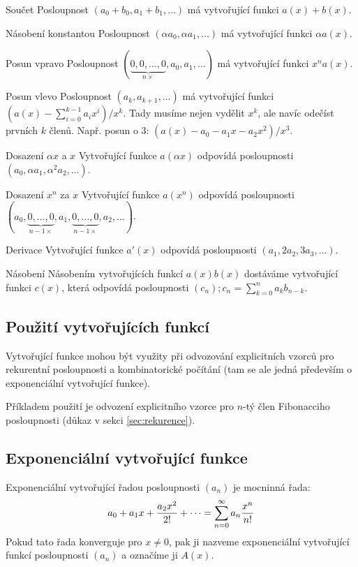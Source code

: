 \begin{description*}
\item[Součet] Posloupnost $(a_0+b_0,a_1+b_1,\dots)$ má vytvořující funkci $a(x)+b(x)$.
\item[Násobení konstantou] Posloupnost $(\alpha a_0, \alpha a_1, \dots)$ má vytvořující funkci $\alpha a(x)$.
\item[Posun vpravo] Posloupnost $(\underbrace{0,0,\dots,0}_{n\times},a_0,a_1,\dots)$ má vytvořující funkci $x^na(x)$.
\item[Posun vlevo] Posloupnost $(a_k,a_{k+1},\dots)$ má vytvořující funkci $(a(x)-\sum_{i=0}^{k-1}a_ix^i)/x^k$. Tady musíme nejen vydělit $x^k$, ale navíc odečíst prvních $k$ členů. Např. posun o 3: $(a(x)-a_0-a_1x-a_2x^2)/x^3$.
\item[Dosazení $\alpha x$ a $x$] Vytvořující funkce $a(\alpha x)$ odpovídá posloupnosti $(a_0,\alpha a_1,\alpha^2 a_2,\dots)$.
\item[Dosazení $x^n$ za $x$] Vytvořující funkce $a(x^n)$ odpovídá posloupnosti $(a_0,\underbrace{0,\dots,0}_{n-1\times},a_1,\underbrace{0,\dots,0}_{n-1\times},a_2,\dots)$.
\item[Derivace] Vytvořující funkce $a'(x)$ odpovídá posloupnosti $(a_1,2a_2,3a_3,\dots)$.
\item[Násobení] Násobením vytvořujících funkcí $a(x)b(x)$ dostáváme vytvořující funkci $c(x)$, která odpovídá posloupnosti $(c_n); c_n = \sum_{k=0}^n a_kb_{n-k}$.
\end{description*}

\subsection{Použití vytvořujících funkcí}

Vytvořující funkce mohou být využity při odvozování explicitních vzorců pro rekurentní posloupnosti a kombinatorické počítání (tam se ale jedná především o exponenciální vytvořující funkce).

Příkladem použití je odvození explicitního vzorce pro $n$-tý člen Fibonacciho posloupnosti (důkaz v sekci \ref{sec:rekurence}).

\subsection{Exponenciální vytvořující funkce}
\df Exponenciální vytvořující řadou posloupnosti $(a_n)$ je mocninná řada:
$$a_0 + a_1x + {a_2x^2 \over 2!} + \dots = \sum_{n=0}^\infty a_n{x^n\over n!}$$
Pokud tato řada konverguje pro $x \neq 0$, pak ji nazveme exponenciální vytvořující funkcí posloupnosti $(a_n)$ a označíme ji $A(x)$.

